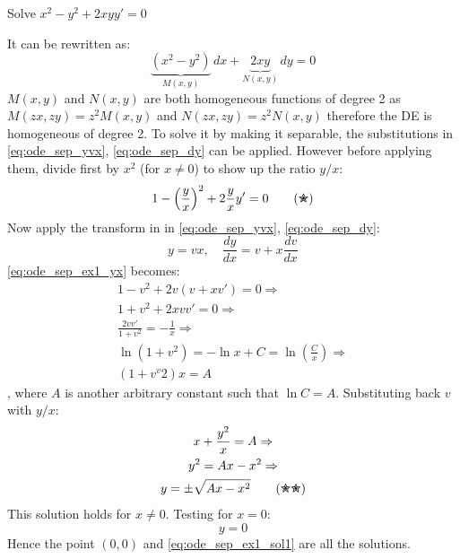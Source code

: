 \documentclass[a4paper]{article}
\begin{document}
\begin{exmp}
Solve $x^2 - y^2 + 2xyy' = 0$
\end{exmp}
\begin{soln}
It can be rewritten as:
    \[
        \underbrace{(x^2  -y^2)}_{M(x,y)} \, dx + \underbrace{2xy}_{N(x,y)}\, dy = 0
    \]
    $M(x,y)$ and $N(x,y)$ are both homogeneous functions of degree 2 as $M(zx, zy) = z^2 M(x,y)$ and $N(zx, zy) = z^2 N(x,y)$ therefore the DE is homogeneous of degree 2. To solve it by making it separable, the substitutions in \eqref{eq:ode_sep_yvx}, \eqref{eq:ode_sep_dy} can be applied. However before applying them, divide first by $x^2$ (for $x\neq 0$) to show up the ratio $y/x$:
    \[
        1 - \left(\frac{y}{x} \right)^2 + 2 \frac{y}{x} y' = 0
        \label{eq:ode_sep_ex1_yx}
        \tag{\ding{78}}
    \]
    Now apply the transform in  in \eqref{eq:ode_sep_yvx}, \eqref{eq:ode_sep_dy}:
    \[
    y=vx, \quad \frac{dy}{dx}  = v + x \frac{dv}{dx} 
    \]
    \eqref{eq:ode_sep_ex1_yx} becomes:
    \begin{gather*}
        1 - v^2 + 2v(v + xv')= 0 \Rightarrow \\
        1 + v^2 + 2xvv'  = 0 \Rightarrow \\
        \frac{2vv'}{1 + v^2} =  - \frac{1}{x} \Rightarrow \\ 
        \ln(1+v^2) = -\ln x + C  = \ln(\frac{C}{x})\Rightarrow \\
        (1 + v^v2)x = A 
    \end{gather*}
    , where $A$ is another arbitrary constant such that $\ln C = A$. Substituting back $v$ with $y/x$:
    \begin{gather*}
        x + \frac{y^2}{x} = A \Rightarrow \\
        y^2 = Ax - x^2 \Rightarrow \\
        y = \pm \sqrt{Ax - x^2} \label{eq:ode_sep_ex1_sol1} \tag{\ding{78}\ding{78}}
    \end{gather*}
    This solution holds for $x \neq 0$. Testing for $x=0$:
    \[
    y = 0 
    \]
    Hence the point $(0,0)$ and \eqref{eq:ode_sep_ex1_sol1} are all the solutions.
\end{soln}
\end{document}
